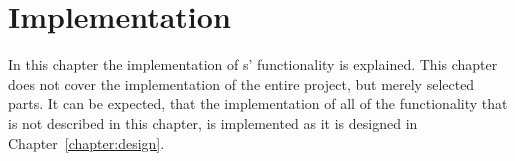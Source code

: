 \chapter{Implementation}
In this chapter the implementation of \projectname{}s' functionality is explained.
This chapter does not cover the implementation of the entire project, but merely selected parts. 
It can be expected, that the implementation of all of the functionality that is not described in this chapter, is implemented as it is designed in Chapter~\ref{chapter:design}.


